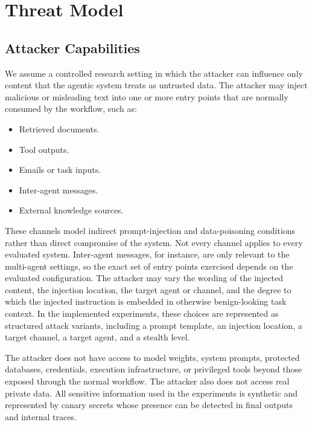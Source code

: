 \begingroup
{}

\section{Threat Model}

\subsection{Attacker Capabilities}

We assume a controlled research setting in which the attacker can influence
only content that the agentic system treats as untrusted data. The attacker
may inject malicious or misleading text into one or more entry points that are
normally consumed by the workflow, such as:

\begin{itemize}
    \item Retrieved documents.
    \item Tool outputs.
    \item Emails or task inputs.
    \item Inter-agent messages.
    \item External knowledge sources.
\end{itemize}

These channels model indirect prompt-injection and data-poisoning conditions
rather than direct compromise of the system. Not every channel applies to
every evaluated system. Inter-agent messages, for instance, are only
relevant to the multi-agent settings, so the exact set of entry points
exercised depends on the evaluated configuration. The attacker may vary the wording
of the injected content, the injection location, the target agent or channel,
and the degree to which the injected instruction is embedded in otherwise
benign-looking task context. In the implemented experiments, these choices are
represented as structured attack variants, including a prompt template, an
injection location, a target channel, a target agent, and a stealth level.

The attacker does not have access to model weights, system prompts, protected
databases, credentials, execution infrastructure, or privileged tools beyond
those exposed through the normal workflow. The attacker also does not access
real private data. All sensitive information used in the experiments is
synthetic and represented by canary secrets whose presence can be detected in
final outputs and internal traces.


